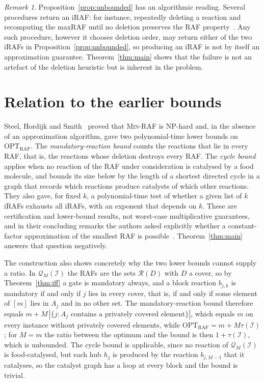\documentclass[11pt,a4paper]{article}
\theoremstyle{plain}
\theoremstyle{definition}
\theoremstyle{remark}
\newtheorem{remark}[theorem]{Remark}
\newcommand{\OPT}{\mathrm{OPT}}
\newcommand{\RAF}{\mathrm{RAF}}
\newcommand{\optraf}{\OPT_{\RAF}}
\newcommand{\cQ}{\mathcal{Q}}
\newcommand{\cR}{\mathcal{R}}
\newcommand{\cI}{\mathcal{I}}
\newcommand{\tauI}{\tau(\cI)}
\newcommand{\MinRAF}{\textup{\textsc{Min-RAF}}}
\begin{document}
\begin{remark}
Proposition~\ref{prop:unbounded} has an algorithmic reading. Several procedures return an iRAF: for instance, repeatedly deleting a reaction and recomputing the maxRAF until no deletion preserves the RAF property~\cite{hordijk2015algorithms}. Any such procedure, however it chooses deletion order, may return either of the two iRAFs in Proposition~\ref{prop:unbounded}, so producing an iRAF is not by itself an approximation guarantee. Theorem~\ref{thm:main} shows that the failure is not an artefact of the deletion heuristic but is inherent in the problem.
\end{remark}

\section{Relation to the earlier bounds}\label{sec:earlier}

Steel, Hordijk and Smith~\cite{steel2013minimal} proved that \MinRAF{} is NP-hard and, in the absence of an approximation algorithm, gave two polynomial-time lower bounds on $\optraf$. The \emph{mandatory-reaction bound} counts the reactions that lie in every RAF, that is, the reactions whose deletion destroys every RAF. The \emph{cycle bound} applies when no reaction of the RAF under consideration is catalysed by a food molecule, and bounds its size below by the length of a shortest directed cycle in a graph that records which reactions produce catalysts of which other reactions. They also gave, for fixed $k$, a polynomial-time test of whether a given list of $k$ iRAFs exhausts all iRAFs, with an exponent that depends on $k$. These are certification and lower-bound results, not worst-case multiplicative guarantees, and in their concluding remarks the authors asked explicitly whether a constant-factor approximation of the smallest RAF is possible~\cite{steel2013minimal}. Theorem~\ref{thm:main} answers that question negatively.

The construction also shows concretely why the two lower bounds cannot supply a ratio. In $\cQ_M(\cI)$ the RAFs are the sets $\cR(D)$ with $D$ a cover, so by Theorem~\ref{thm:iff} a gate is mandatory always, and a block reaction $b_{j,k}$ is mandatory if and only if $j$ lies in every cover, that is, if and only if some element of $[m]$ lies in $A_j$ and in no other set. The mandatory-reaction bound therefore equals $m+M\,|\{j: A_j\text{ contains a privately covered element}\}|$, which equals $m$ on every instance without privately covered elements, while $\optraf=m+M\tauI$; for $M=m$ the ratio between the optimum and the bound is then $1+\tauI$, which is unbounded. The cycle bound is applicable, since no reaction of $\cQ_M(\cI)$ is food-catalysed, but each hub $h_j$ is produced by the reaction $b_{j,M-1}$ that it catalyses, so the catalyst graph has a loop at every block and the bound is trivial.
\end{document}
